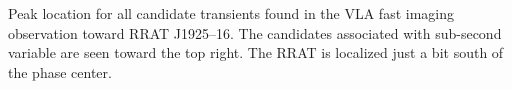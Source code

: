 Peak location for all candidate transients found in the VLA fast imaging observation toward RRAT J1925--16. The candidates associated with sub-second variable are seen toward the top right. The RRAT is localized just a bit south of the phase center. 